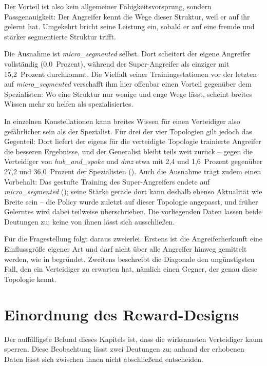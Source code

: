 Der Vorteil ist also kein allgemeiner Fähigkeitsvorsprung, sondern
Passgenauigkeit: Der Angreifer kennt die Wege dieser Struktur, weil er auf ihr
gelernt hat. Umgekehrt bricht seine Leistung ein, sobald er auf eine fremde und
stärker segmentierte Struktur trifft.

Die Ausnahme ist \emph{micro\_segmented} selbst. Dort scheitert der eigene
Angreifer vollständig (0,0~Prozent), während der Super-Angreifer als einziger
mit 15,2~Prozent durchkommt. Die Vielfalt seiner
Trainingsstationen vor der letzten auf \emph{micro\_segmented} verschafft
ihm hier offenbar einen Vorteil gegenüber dem Spezialisten: Wo eine
Struktur nur wenige und enge Wege lässt, scheint breites Wissen mehr zu
helfen als spezialisiertes.

In einzelnen Konstellationen kann breites Wissen für einen Verteidiger
also gefährlicher sein als der Spezialist. Für drei der vier Topologien
gilt jedoch das Gegenteil: Dort liefert der eigens für die verteidigte
Topologie trainierte Angreifer die besseren Ergebnisse, und der Generalist
bleibt teils weit zurück -- gegen die Verteidiger von \emph{hub\_and\_spoke} und \emph{dmz}
etwa mit 2,4 und 1,6~Prozent gegenüber 27,2 und 36,0~Prozent der
Spezialisten (). Auch die Ausnahme trägt zudem einen
Vorbehalt: Das gestufte Training des Super-Angreifers endete auf
\emph{micro\_segmented} (); seine Stärke gerade dort kann
deshalb ebenso Aktualität wie Breite sein -- die Policy wurde zuletzt auf
dieser Topologie angepasst, und früher Gelerntes wird dabei teilweise
überschrieben. Die vorliegenden Daten lassen beide Deutungen zu; keine von ihnen
lässt sich ausschließen.

Für die Fragestellung folgt daraus zweierlei. Erstens ist die
Angreiferherkunft eine Einflussgröße eigener Art und darf nicht über alle
Angreifer hinweg gemittelt werden, wie in  begründet.
Zweitens beschreibt die Diagonale den ungünstigsten Fall, den ein Verteidiger
zu erwarten hat, nämlich einen Gegner, der genau diese Topologie kennt.

\section{Einordnung des Reward-Designs}
\label{sec:rewarddiskussion}

Der auffälligste Befund dieses Kapitels ist, dass die wirksamsten Verteidiger
kaum sperren. Diese Beobachtung lässt zwei Deutungen zu; anhand der erhobenen
Daten lässt sich zwischen ihnen nicht abschließend entscheiden.


